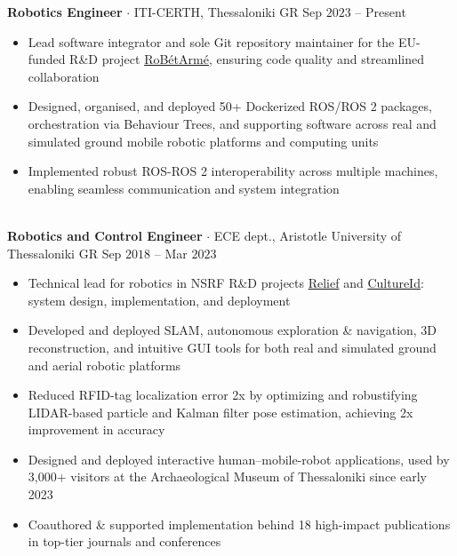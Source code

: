 \documentclass[a4paper,10pt,twoside]{article}
\begin{document}
  \noindent\textbf{Robotics Engineer} $\cdot$ ITI-CERTH, Thessaloniki GR \hfill {\small Sep $2023$ -- Present} \\
  \begin{minipage}[t]{\textwidth}
    \begin{itemize}
      \item Lead software integrator and sole Git repository maintainer for the EU-funded R\&D project \href{https://www.robetarme-project.eu/}{RoBétArmé}, ensuring code quality and streamlined collaboration\vspace{-0.8em}
      \item Designed, organised, and deployed 50+ Dockerized ROS/ROS 2 packages, orchestration via Behaviour Trees, and supporting software across real and simulated ground mobile robotic platforms and computing units\vspace{-0.8em}
      \item Implemented robust ROS-ROS 2 interoperability across multiple machines, enabling seamless communication and system integration
    \end{itemize}
  \end{minipage} \\[0.4em]

  \noindent\textbf{Robotics and Control Engineer} $\cdot$ ECE dept., Aristotle University of Thessaloniki GR \hfill {\small Sep $2018$ -- Mar $2023$} \\
  \begin{minipage}[t]{\textwidth}
    \begin{itemize}
      \item Technical lead for robotics in NSRF R\&D projects \href{https://relief.web.auth.gr/language/en/home/}{Relief} and \href{https://cultureid.web.auth.gr/?page\_id=200&lang=en}{CultureId}: system design, implementation, and deployment \vspace{-0.8em}
      \item Developed and deployed SLAM, autonomous exploration \& navigation, 3D reconstruction, and intuitive GUI tools for both real and simulated ground and aerial robotic platforms \vspace{-0.8em}
      \item Reduced RFID-tag localization error 2x by optimizing and robustifying LIDAR-based particle and Kalman filter pose estimation, achieving 2x improvement in accuracy \vspace{-0.8em}
      \item Designed and deployed interactive human--mobile-robot applications, used by 3,000+ visitors at the Archaeological Museum of Thessaloniki since early 2023 \vspace{-0.8em}
      \item Coauthored \& supported implementation behind 18 high-impact publications in top-tier journals and conferences
    \end{itemize}
  \end{minipage} \\[0.4em]
\end{document}
